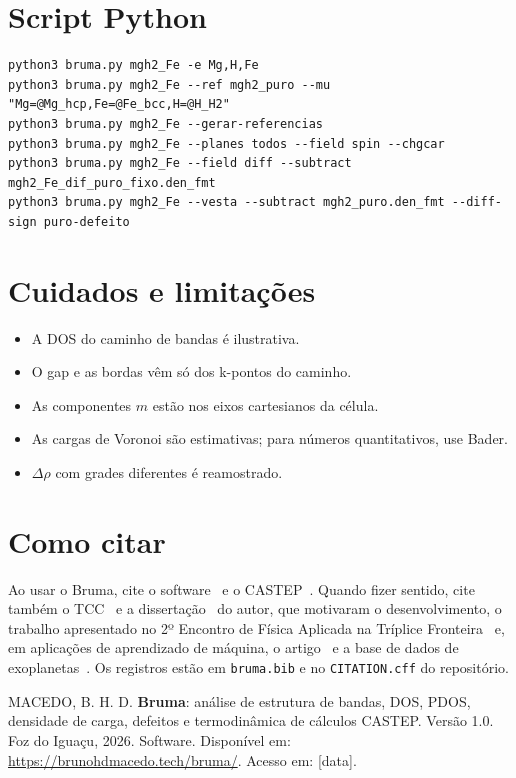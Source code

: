 \documentclass[11pt,a4paper]{article}
\newcommand{\cp}{\textsf{Bruma}}
\begin{document}
\section{Script Python}
\begin{lstlisting}
python3 bruma.py mgh2_Fe -e Mg,H,Fe
python3 bruma.py mgh2_Fe --ref mgh2_puro --mu "Mg=@Mg_hcp,Fe=@Fe_bcc,H=@H_H2"
python3 bruma.py mgh2_Fe --gerar-referencias
python3 bruma.py mgh2_Fe --planes todos --field spin --chgcar
python3 bruma.py mgh2_Fe --field diff --subtract mgh2_Fe_dif_puro_fixo.den_fmt
python3 bruma.py mgh2_Fe --vesta --subtract mgh2_puro.den_fmt --diff-sign puro-defeito
\end{lstlisting}

\section{Cuidados e limitações}
\begin{itemize}
  \item A DOS do caminho de bandas é ilustrativa.
  \item O gap e as bordas vêm só dos k-pontos do caminho.
  \item As componentes $m$ estão nos eixos cartesianos da célula.
  \item As cargas de Voronoi são estimativas; para números quantitativos, use Bader.
  \item $\Delta\rho$ com grades diferentes é reamostrado.
\end{itemize}

\section{Como citar}
Ao usar o \cp, cite o software~\cite{macedo2026bruma} e o CASTEP~\cite{clark2005castep}. Quando fizer sentido, cite também o TCC~\cite{macedo2025tcc} e a dissertação~\cite{macedo2027dissertacao} do autor, que motivaram o desenvolvimento, o trabalho apresentado no 2º Encontro de Física Aplicada na Tríplice Fronteira~\cite{macedo2025efatf} e, em aplicações de aprendizado de máquina, o artigo~\cite{macedo2024rbic} e a base de dados de exoplanetas~\cite{macedo2024dataset}. Os registros estão em \texttt{bruma.bib} e no \texttt{CITATION.cff} do repositório.

\begin{nota}[title={Referência sugerida (ABNT)}]
MACEDO, B. H. D. \textbf{Bruma}: análise de estrutura de bandas, DOS, PDOS, densidade de carga, defeitos e termodinâmica de cálculos CASTEP. Versão 1.0. Foz do Iguaçu, 2026. Software. Disponível em: \url{https://brunohdmacedo.tech/bruma/}. Acesso em: [data].
\end{nota}

\nocite{ganose2018sumo,plotly2015}


\end{document}
